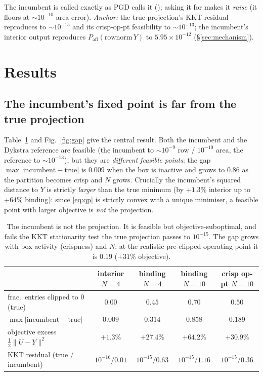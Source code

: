 \documentclass[11pt,a4paper]{article}
\begin{document}
The incumbent is called exactly as PGD calls it (); asking it for 
makes it \emph{raise} (it floors at \(\sim\!10^{-10}\) area error). \emph{Anchor:} the true
projection's KKT residual reproduces to \(\sim\!10^{-15}\) and its crisp-op-pt feasibility to
\(\sim\!10^{-13}\); the incumbent's interior output reproduces
\(P_{\text{aff}}(\text{rownorm}\,Y)\) to \(5.95{\times}10^{-12}\) (\S\ref{sec:mechanism}).

\section{Results}

\subsection{The incumbent's fixed point is far from the true projection}
\label{sec:gap}
Table~\ref{tab:gap} and Fig.~\ref{fig:gap} give the central result. Both the incumbent and the
Dykstra reference are feasible (the incumbent to \(\sim\!10^{-9}\) row / \(10^{-10}\) area, the
reference to \(\sim\!10^{-13}\)), but they are \emph{different feasible points}: the gap
\(\max|\text{incumbent}-\text{true}|\) is \(0.009\) when the box is inactive and grows to
\(0.86\) as the partition becomes crisp and \(N\) grows. Crucially the incumbent's squared
distance to \(Y\) is strictly \emph{larger} than the true minimum (by \(+1.3\%\) interior up to
\(+64\%\) binding): since \eqref{eq:qp} is strictly convex with a unique minimiser, a feasible
point with larger objective is \emph{not} the projection.

\begin{table}[H]
\centering\small
\begin{tabular}{@{}lcccc@{}}
\toprule
 & interior \(N{=}4\) & binding \(N{=}4\) & binding \(N{=}10\) & crisp op-pt \(N{=}10\) \\
\midrule
frac.\ entries clipped to 0 (true) & \(0.00\) & \(0.45\) & \(0.70\) & \(0.50\) \\
\(\max|\text{incumbent}-\text{true}|\) & \(0.009\) & \(0.314\) & \(\mathbf{0.858}\) & \(0.189\) \\
objective excess \(\tfrac12\|U-Y\|^2\) & \(+1.3\%\) & \(+27.4\%\) & \(\mathbf{+64.2\%}\) & \(+30.9\%\) \\
KKT residual (true / incumbent) & \(10^{-16}/0.01\) & \(10^{-15}/0.63\) & \(10^{-15}/1.16\) & \(10^{-15}/0.36\) \\
\bottomrule
\end{tabular}
\caption{The incumbent is not the projection. It is feasible but objective-suboptimal, and fails
the KKT stationarity test the true projection passes to \(10^{-15}\). The gap grows with box
activity (crispness) and \(N\); at the realistic pre-clipped operating point it is \(0.19\)
(\(+31\%\) objective).}
\label{tab:gap}
\end{table}
\end{document}

